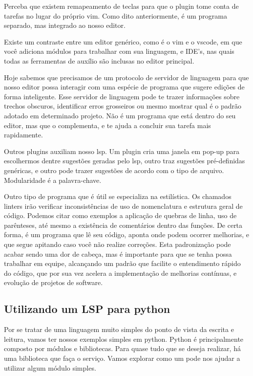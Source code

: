 
Perceba que existem remapeamento de teclas para que o plugin tome conta de tarefas no lugar do próprio vim.
Como dito anteriormente, é um programa separado, mas integrado ao nosso editor.

Existe um contraste entre um editor genérico, como é o vim e o vscode,
em que você adiciona módulos para trabalhar com sua linguagem, e IDE's,
nas quais todas as ferramentas de auxílio são inclusas no editor principal.

Hoje sabemos que precisamos de um protocolo de servidor de linguagem 
para que nosso editor possa
interagir com uma espécie de programa que sugere edições de forma inteligente.
Esse servidor de linguagem pode te trazer informações sobre trechos obscuros, identificar erros grosseiros
ou mesmo mostrar qual é o padrão adotado em determinado projeto.
Não é um programa que está dentro do seu editor, mas que o complementa,
e te ajuda a concluir sua tarefa mais rapidamente.

Outros plugins auxiliam nosso lsp. Um plugin cria uma janela em pop-up para escolhermos dentre sugestões geradas pelo lsp,
outro traz sugestões pré-definidas genéricas, e outro pode trazer sugestões de acordo com o tipo de arquivo.
Modularidade é a palavra-chave.


Outro tipo de programa que é útil se especializa na estilística.
Os chamados linters irão verificar inconsistências de uso de nomenclatura e
estrutura geral de código. Podemos citar como exemplos a aplicação de quebras de linha, uso de parênteses,
até mesmo a existência de comentários dentro das funções.
De certa forma, é um programa que lê seu código, aponta onde podem ocorrer melhorias, e que segue apitando
caso você não realize correções.
Esta padronização pode acabar sendo uma dor de cabeça, mas é importante para que se tenha possa trabalhar em equipe,
alcançando um padrão que facilite o entendimento rápido do código, que por sua vez acelera a implementação de melhorias
contínuas, e evolução de projetos de software.

\subsection{Utilizando um LSP para python}
Por se tratar de uma linguagem muito simples do ponto de vista da escrita e leitura,
vamos ter nossos exemplos simples em python.
Python é principalmente composto por módulos e bibliotecas.
Para quase tudo que se deseja realizar, há uma biblioteca que faça o serviço.
Vamos explorar como um  pode nos ajudar a utilizar algum módulo simples.

